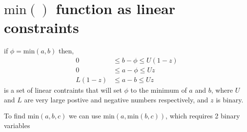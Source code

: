\documentclass[letterpaper]{article}
\begin{document}
\section{$\text{min}()$ function as linear constraints}

if $\phi = \text{min}\left( a,b \right) $ then,
\begin{align}
0 &\le b - \phi \le U(1- z) \\
0 &\le a - \phi \le Uz \\
L(1-z) &\le a - b \le Uz
\end{align}
is a set of linear contraints that will set $\phi$ to the minimum of $a$ and $b$, where $U$ and $L$ are very large postive and negative numbers respectively, and $z$ is binary.

To find $\text{min}(a,b,c)$ we can use $\text{min}(a,\text{min}(b,c))$, which requires 2 binary variables
\end{document}
